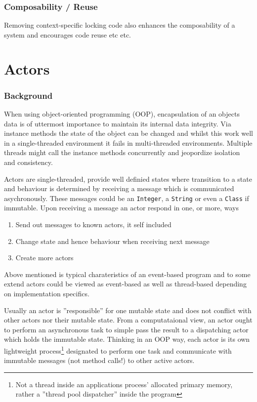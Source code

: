 \documentclass[a4paper,12pt]{kth-mag}
\begin{document}
\section{Composability / Reuse}

Removing context-specific locking code also enhances the composability of a system and encourages code reuse etc etc.

\part{ Actors}

\section{Background}
When using object-oriented programming (OOP), encapsulation of an objects data is of uttermost importance to maintain its internal data integrity. Via instance methods the state of the object can be changed and whilst this work well in a single-threaded environment it fails in multi-threaded environments. Multiple threads might call the instance methods concurrently and jeopordize isolation and consistency. 

Actors are single-threaded, provide well definied states where transition to a state and behaviour is determined by receiving a message which is communicated asychronously. These messages could be an \texttt{Integer}, a \texttt{String} or even a \texttt{Class} if immutable. Upon receiving a message an actor respond in one, or more, ways \cite{scalaactors}

\begin{enumerate}
\item Send out messages to known actors, it self included
\item Change state and hence behaviour when receiving next message
\item Create more actors
\end{enumerate}

Above mentioned is typical charateristics of an event-based program and to some extend actors could be viewed as event-based as well as thread-based depending on implementation specifics.

Usually an actor is ''responsible'' for one mutable state and does not conflict with other actors nor their mutable state. From a computataional view, an actor ought to perform an asynchronous task to simple pass the result to a dispatching actor which holds the immutable state. Thinking in an OOP way, each actor is its own lightweight process\footnote{Not a thread inside an applications process' allocated primary memory, rather a ''thread pool dispatcher'' inside the program} designated to perform one task and communicate with immutable messages (not method calls!) to other active actors.
\end{document}
